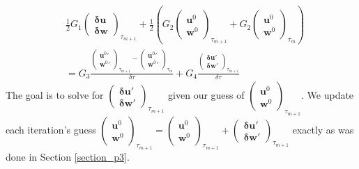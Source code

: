 \documentclass[11pt,fleqn]{article}
\theoremstyle{defstyle}
\begin{document}
\begin{equation}
\begin{aligned}
&\frac{1}{2}G_1 \begin{pmatrix}
\mathbf{\delta u} \\ \mathbf{\delta w} 
\end{pmatrix}_{\tau_{m+1}} +\frac{1}{2} \left(G_2 \begin{pmatrix}
\mathbf{u}^0 \\ \mathbf{w}^0 
\end{pmatrix}_{\tau_{m+1}} + G_2 \begin{pmatrix}
\mathbf{u}^0 \\ \mathbf{w}^0 
\end{pmatrix}_{\tau_{m}}\right)
\\ &= G_3 \frac{\begin{pmatrix}
\mathbf{u}^0\prime \\ \mathbf{w}^0\prime 
\end{pmatrix}_{\tau_{m+1}} - \begin{pmatrix}
\mathbf{u}^0\prime \\ \mathbf{w}^0\prime 
\end{pmatrix}_{\tau_{m}}}{\delta \tau} + G_4 \frac{\begin{pmatrix}
\mathbf{\delta u}\prime \\ \mathbf{\delta w}\prime 
\end{pmatrix}_{\tau_{m+1}}}{\delta \tau} 
\end{aligned}
\label{eq_p4mat4}
\end{equation}
The goal is to solve for $\begin{pmatrix} \mathbf{\delta u}\prime \\ \mathbf{\delta w}\prime 
\end{pmatrix}_{\tau_{m+1}}$ given our guess of $\begin{pmatrix}
\mathbf{u}^0 \\ \mathbf{w}^0 \end{pmatrix}_{\tau_{m+1}}$. We update each iteration's guess $\begin{pmatrix}
\mathbf{u}^0 \\ \mathbf{w}^0 \end{pmatrix}_{\tau_{m+1}} = \begin{pmatrix} \mathbf{u}^0 \\ \mathbf{w}^0 \end{pmatrix}_{\tau_{m+1}} + \begin{pmatrix} \mathbf{\delta u}\prime \\ \mathbf{\delta w}\prime \end{pmatrix}_{\tau_{m+1}}$ exactly as was done in Section \ref{section_p3}. 
\end{document}
